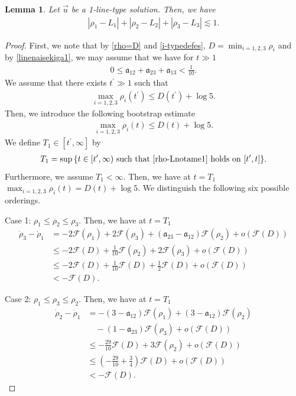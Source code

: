 \documentclass[10pt,a4paper]{amsart}
\newtheorem{lemma}[theorem]{Lemma}
\numberwithin{equation}{section}
\begin{document}
\begin{lemma}\label{rhoi-Liyuukailem}
Let $\vec{u}$ be a 1-line-type solution. Then, we have
\begin{align}\label{rhii-Liyuukai}
\left|\rho_1-L_1\right|+\left|\rho_2-L_2\right|+\left|\rho_3-L_3\right|\lesssim 1.
\end{align}
\end{lemma}
\begin{proof}
First, we note that by \eqref{rho=D} and \eqref{i-typedefes}, $D=\min_{i=1,2,3}\rho_i$ and by \eqref{linenaisekiga1}, we may assume that we have for $t\gg 1$
\begin{align*}
0\leq \mathfrak{a}_{12}+\mathfrak{a}_{23}+\mathfrak{a}_{13}<\frac{1}{10}.
\end{align*}
We assume that there exists $t^{\prime}\gg 1$ such that 
\begin{align*}
\max_{i=1,2,3}\rho_i(t^{\prime})\leq D(t^{\prime})+\log{5}.
\end{align*}
Then, we introduce the following bootstrap estimate
\begin{align}\label{rho-Lnotame1}
\max_{i=1,2,3}\rho_i(t)\leq D(t)+\log{5}.
\end{align}
We define $T_1\in [t^{\prime},\infty]$ by
\begin{align}\label{rho-Lyuukaibs}
T_1=\sup{\{t\in[t^{\prime},\infty)\ \mbox{such that}\ \eqref{rho-Lnotame1}\ \mbox{holds on}\ [t^{\prime},t] \}}.
\end{align}
Furthermore, we assume $T_1<\infty$. Then, we have at $t=T_1$ $\max_{i=1,2,3}\rho_i(t)=D(t)+\log{5}$. We distinguish the following six possible orderings.

Case 1: $\rho_1\leq \rho_2\leq \rho_3$. Then, we have at $t=T_1$
\begin{align*}
\dot{\rho}_3-\dot{\rho}_1&=-2\mathcal{F}(\rho_1)+2\mathcal{F}(\rho_3)+\left(\mathfrak{a}_{23}-\mathfrak{a}_{12}\right)\mathcal{F}(\rho_2)+o\left(\mathcal{F}(D)\right)
\\
&\leq -2\mathcal{F}(D)+\frac{1}{10}\mathcal{F}(\rho_2)+2\mathcal{F}(\rho_3)+o\left(\mathcal{F}(D)\right)
\\
&\leq  -2\mathcal{F}(D)+\frac{1}{10}\mathcal{F}(D)+\frac{1}{2}\mathcal{F}(D)+o\left(\mathcal{F}(D)\right)
\\
&<-\mathcal{F}(D).
\end{align*}

Case 2: $\rho_1\leq \rho_3\leq \rho_2$. Then, we have at $t=T_1$
\begin{align*}
\dot{\rho}_2-\dot{\rho}_1&=-\left(3-\mathfrak{a}_{12}\right)\mathcal{F}(\rho_1)+\left(3-\mathfrak{a}_{12}\right)\mathcal{F}(\rho_2)
\\
&\quad -\left(1-\mathfrak{a}_{23}\right)\mathcal{F}(\rho_3)+o\left(\mathcal{F}(D)\right)
\\
&\leq -\frac{29}{10}\mathcal{F}(D)+3\mathcal{F}(\rho_2)+o\left(\mathcal{F}(D)\right)
\\
&\leq\left(-\frac{29}{10}+\frac{3}{4}\right)\mathcal{F}(D)+o\left(\mathcal{F}(D)\right)
\\
&<-\mathcal{F}(D).
\end{align*}


\end{proof}
\end{document}
